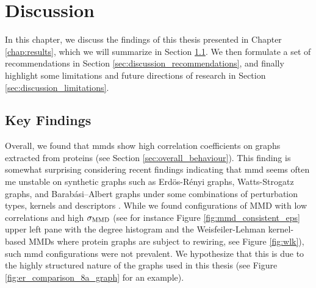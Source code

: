 \chapter{Discussion}\label{chap:discussion}

In this chapter, we discuss the findings of this thesis presented in Chapter
\ref{chap:results}, which we will summarize in Section \ref{sec:key_findings}.
We then formulate a set of recommendations in Section
\ref{sec:discussion_recommendations}, and finally highlight some limitations and
future directions of research in Section \ref{sec:discussion_limitations}.

\section{Key Findings}\label{sec:key_findings}

Overall, we found that \acrshort{mmd}s show high correlation coefficients on
graphs extracted from proteins (see Section \ref{sec:overall_behaviour}). This
finding is somewhat surprising considering recent findings indicating that
\acrshort{mmd} seems often me unstable on synthetic graphs such as Erd\"os-Rényi
graphs, Watts-Strogatz graphs, and Barabási–Albert graphs under some
combinations of perturbation types, kernels and descriptors
\citep{obray2022evaluation}. While we found configurations of MMD with
low correlations and high $\sigma_{\text{MMD}}$ (see for instance Figure
\ref{fig:mmd_consistent_eps} upper left pane with the degree histogram and the
Weisfeiler-Lehman kernel-based MMDs where protein graphs are subject to
rewiring, see Figure \ref{fig:wlk}), such \acrshort{mmd} configurations were not
prevalent. We hypothesize that this is due to the highly structured nature of
the graphs used in this thesis (see Figure \ref{fig:er_comparison_8a_graph} for
an example).


